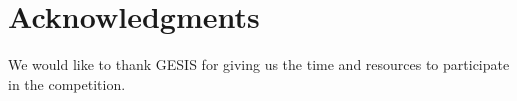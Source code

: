 \section*{Acknowledgments} 
We would like to thank GESIS for giving us the time and resources to participate in the competition.

